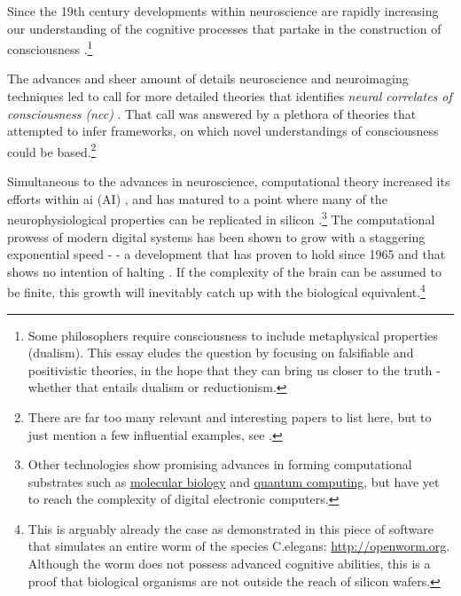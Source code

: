 \documentclass[a4paper,oneside]{memoir}
\begin{document}
Since the 19th century developments within neuroscience are rapidly
increasing our understanding of the cognitive processes that partake in
the construction of \gls{consciousness} \autocite{atkinson2000}.\footnote{
Some philosophers require consciousness
to include metaphysical properties \autocite{sep-consciousness} (dualism).
This essay eludes the question by
focusing on falsifiable and positivistic theories, in the hope that
they can bring us closer to the truth - whether that entails dualism
or reductionism.}

The advances and sheer amount of details neuroscience and neuroimaging
techniques led \textcite{atkinson2000} to call for more detailed theories
that identifies \textit{neural correlates of consciousness (\gls{ncc})}
\autocite{atkinson2000}. That call was answered by a plethora of theories
that attempted to infer frameworks, on which novel understandings of
consciousness could be based.\footnote{There are far too many relevant
and interesting papers to list here, but to just mention a few influential examples,
see \cite{baars2005, block2007, crick2003, damasio2003, dehaene2001, kouider2010, Tononi2004, zeki2008, sep-consciousness, schmidhuber2014, Nilsson2009}.
}

Simultaneous to the advances in neuroscience, \gls{computation}al theory
increased its efforts within \gls{ai} (AI) \autocite{Nilsson2009}, and has
matured to a point where many of the neurophysiological properties can be
replicated in silicon \autocite{Tononi2004, schmidhuber2014, walter2015}.\footnote{Other
technologies show promising advances in forming computational substrates such
as \href{https://en.wikipedia.org/wiki/DNA_computing}{molecular biology}
and \href{https://en.wikipedia.org/wiki/Quantum_computing}{quantum computing},
but have yet to reach the complexity of digital electronic computers.}
The computational prowess of modern digital systems has been shown to grow
with a staggering exponential speed \autocite{Moore1965} - - a development that has proven to
hold since 1965 and that shows no intention of halting
\autocite{Moravec98,kurzweil2001}. If the complexity of the brain can be 
assumed to be finite, this growth will inevitably catch up with the biological
equivalent.\footnote{This is arguably already the case as demonstrated in this
piece of software that simulates an entire worm of the species C.elegans:
\url{http://openworm.org}. Although the worm does not possess advanced cognitive
abilities, this is a proof that biological organisms are not outside the reach
of silicon wafers.}
\end{document}
